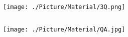 \documentclass[xcolor=table,compress,blue]{beamer}
\begin{document}
\section{}
\begin{frame}[plain]
	\thispagestyle{empty}
	\begin{columns}
		\begin{column}{\paperwidth}
			\texttt{[image: ./Picture/Material/3Q.png]}
		\end{column}
	\end{columns}
\end{frame}

\begin{frame}[plain]
	\thispagestyle{empty}
	\begin{columns}
		\begin{column}{\paperwidth}
			\texttt{[image: ./Picture/Material/QA.jpg]}
		\end{column}
	\end{columns}
\end{frame}
\end{document}
